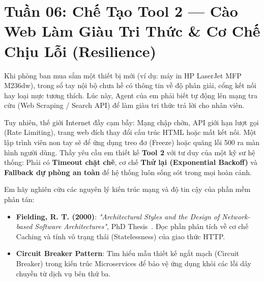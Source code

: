 ﻿\section{Tuần 06: Chế Tạo Tool 2 — Cào Web Làm Giàu Tri Thức \& Cơ Chế Chịu Lỗi (Resilience)}
\label{sec:tuan_06}

\begin{advisorbox}
Khi phòng ban mua sắm một thiết bị mới (ví dụ: máy in HP LaserJet MFP M236dw), trong sổ tay nội bộ chưa hề có thông tin về độ phân giải, cổng kết nối hay loại mực tương thích. Lúc này, Agent của em phải biết tự động lên mạng tra cứu (Web Scraping / Search API) để làm giàu tri thức trả lời cho nhân viên.

Tuy nhiên, thế giới Internet đầy cạm bẫy: Mạng chập chờn, API giới hạn lượt gọi (Rate Limiting), trang web đích thay đổi cấu trúc HTML hoặc mất kết nối. Một lập trình viên non tay sẽ để ứng dụng treo đơ (Freeze) hoặc quăng lỗi 500 ra màn hình người dùng. Thầy yêu cầu em thiết kế \textbf{Tool 2} với tư duy của một kỹ sư hệ thống: Phải có \textbf{Timeout chặt chẽ}, cơ chế \textbf{Thử lại (Exponential Backoff)} và \textbf{Fallback dự phòng an toàn} để hệ thống luôn sống sót trong mọi hoàn cảnh.
\end{advisorbox}

\begin{literaturebox}
Em hãy nghiên cứu các nguyên lý kiến trúc mạng và độ tin cậy của phần mềm phân tán:
\begin{itemize}[leftmargin=1.5em]
    \item \textbf{Fielding, R. T. (2000)}: \textit{"Architectural Styles and the Design of Network-based Software Architectures"}, PhD Thesis~\cite{fielding2000rest}. Đọc phần phân tích về cơ chế Caching và tính vô trạng thái (Statelessness) của giao thức HTTP.
    \item \textbf{Circuit Breaker Pattern}: Tìm hiểu mẫu thiết kế ngắt mạch (Circuit Breaker) trong kiến trúc Microservices để bảo vệ ứng dụng khỏi các lỗi dây chuyền từ dịch vụ bên thứ ba.
\end{itemize}
\end{literaturebox}


